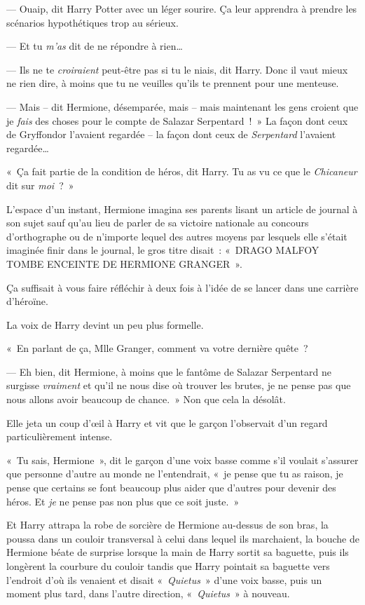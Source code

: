 --- Ouaip, dit Harry Potter avec un léger sourire. Ça leur apprendra à prendre les scénarios hypothétiques trop au sérieux.

--- Et tu \emph{m'as} dit de ne répondre à rien…

--- Ils ne te \emph{croiraient} peut-être pas si tu le niais, dit Harry. Donc il vaut mieux ne rien dire, à moins que tu ne veuilles qu'ils te prennent pour une menteuse.

--- Mais -- dit Hermione, désemparée, mais -- mais maintenant les gens croient que je \emph{fais} des choses pour le compte de Salazar Serpentard~!~» La façon dont ceux de Gryffondor l'avaient regardée -- la façon dont ceux de \emph{Serpentard} l'avaient regardée…

«~Ça fait partie de la condition de héros, dit Harry. Tu as vu ce que le \emph{Chicaneur} dit sur \emph{moi}~?~»

L'espace d'un instant, Hermione imagina ses parents lisant un article de journal à son sujet sauf qu'au lieu de parler de sa victoire nationale au concours d'orthographe ou de n'importe lequel des autres moyens par lesquels elle s'était imaginée finir dans le journal, le gros titre disait~: «~DRAGO MALFOY TOMBE ENCEINTE DE HERMIONE GRANGER~».

Ça suffisait à vous faire réfléchir à deux fois à l'idée de se lancer dans une carrière d'héroïne.

La voix de Harry devint un peu plus formelle.

«~En parlant de ça, Mlle Granger, comment va votre dernière quête~?

--- Eh bien, dit Hermione, à moins que le fantôme de Salazar Serpentard ne surgisse \emph{vraiment} et qu'il ne nous dise où trouver les brutes, je ne pense pas que nous allons avoir beaucoup de chance.~» Non que cela la désolât.

Elle jeta un coup d'œil à Harry et vit que le garçon l'observait d'un regard particulièrement intense.

«~Tu sais, Hermione~», dit le garçon d'une voix basse comme s'il voulait s'assurer que personne d'autre au monde ne l'entendrait, «~je pense que tu as raison, je pense que certains se font beaucoup plus aider que d'autres pour devenir des héros. Et \emph{je} ne pense pas non plus que ce soit juste.~»

Et Harry attrapa la robe de sorcière de Hermione au-dessus de son bras, la poussa dans un couloir transversal à celui dans lequel ils marchaient, la bouche de Hermione béate de surprise lorsque la main de Harry sortit sa baguette, puis ils longèrent la courbure du couloir tandis que Harry pointait sa baguette vers l'endroit d'où ils venaient et disait «~\emph{Quietus}~» d'une voix basse, puis un moment plus tard, dans l'autre direction, «~\emph{Quietus}~» à nouveau.

